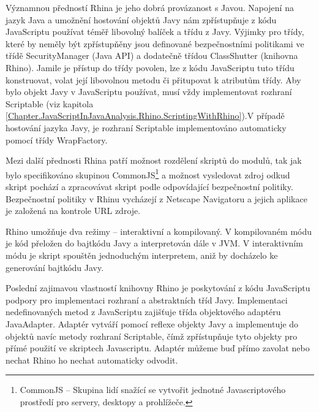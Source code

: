Významnou předností Rhina je jeho dobrá provázanost s Javou. Napojení na jazyk Java a umožnění hostování objektů Javy nám zpřístupňuje z kódu JavaScriptu používat téměř libovolný balíček a třídu z Javy. Výjimky pro třídy, které by neměly být zpřístupňěny jsou definované bezpečnostními politikami ve třídě SecurityManager (Java API) a dodatečně třídou ClassShutter (knihovna Rhino). Jamile je přístup do třídy povolen, lze z kódu JavaScriptu tuto třídu konstruovat, volat její libovolnou metodu či přitupovat k atributům třídy. Aby bylo objekt Javy v JavaScriptu používat, musí vždy implementovat rozhraní Scriptable (viz kapitola \ref{Chapter.JavaScriptInJavaAnalysis.Rhino.ScriptingWithRhino}).V případě hostování jazyka Javy, je rozhraní Scriptable implementováno automaticky pomocí třídy WrapFactory. 

Mezi další přednosti Rhina patří možnost rozdělení skriptů do modulů, tak jak bylo specifikováno skupinou CommonJS\footnote{CommonJS -- Skupina lidí snažící se vytvořit jednotné Javascriptového prostředí pro servery, desktopy a prohlížeče.} a možnost vysledovat zdroj odkud skript pochází a zpracovávat skript podle odpovídající bezpečnostní politiky. Bezpečnostní politiky v Rhinu vycházejí z Netscape Navigatoru a jejich aplikace je založená na kontrole URL zdroje. \cite{Bibliography.Rhino.Overview}

Rhino umožňuje dva režimy -- interaktivní a kompilovaný. V kompilovaném módu je kód přeložen do bajtkódu Javy a interpretován dále v JVM. V interaktivním módu je skript spouštěn jednoduchým interpretem, aniž by docházelo ke generování bajtkódu Javy.

Poslední zajimavou vlastností knihovny Rhino je poskytování z kódu JavaScriptu podpory pro implementaci rozhraní a abstraktních tříd Javy. Implementaci nedefinovaných metod z JavaScriptu zajišťuje třída objektového adaptéru JavaAdapter. Adaptér vytváří pomocí reflexe objekty Javy a implementuje do objektů navíc metody rozhraní Scriptable, čímž zpřístupňuje tyto objekty pro přímé použití ve skriptech Javascriptu. Adaptér můžeme buď přímo zavolat nebo nechat Rhino ho nechat automaticky odvodit. 


